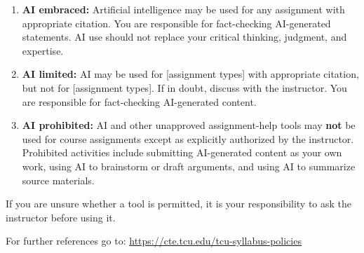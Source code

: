 \begin{enumerate}
\item \textbf{AI embraced:} Artificial intelligence may be used for any assignment with appropriate citation. You are responsible for fact-checking AI-generated statements. AI use should not replace your critical thinking, judgment, and expertise.

\item \textbf{AI limited:} AI may be used for [assignment types] with appropriate citation, but not for [assignment types]. If in doubt, discuss with the instructor. You are responsible for fact-checking AI-generated content.

\item \textbf{AI prohibited:} AI and other unapproved assignment-help tools may \textbf{not} be used for course assignments except as explicitly authorized by the instructor. Prohibited activities include submitting AI-generated content as your own work, using AI to brainstorm or draft arguments, and using AI to summarize source materials.
\end{enumerate}
If you are unsure whether a tool is permitted, it is your responsibility to ask the instructor before using it.

For further references go to: \href{https://cte.tcu.edu/tcu-syllabus-policies}{https://cte.tcu.edu/tcu-syllabus-policies}
